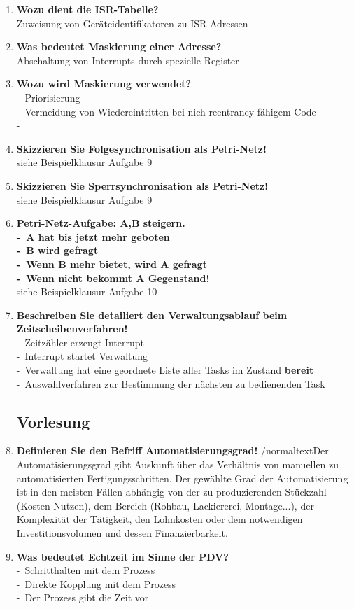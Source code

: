 \documentclass[a4paper,12pt]{article}
\newcommand{\questionnopage}[2]{\pagebreak[3]\item {\textbf{#1?}}#2}
\newcommand{\statementnopage}[2]{\pagebreak[3]\item {\textbf{#1!}}#2}
\newcommand{\catchword}[1]{\\-\ #1}
\newcommand{\normaltext}[1]{\\#1}
\newcommand{\important}[1]{\textbf{#1}}
\begin{document}
\begin{enumerate}
  \questionnopage{Wozu dient die ISR-Tabelle}
  {
    \normaltext{Zuweisung von Geräteidentifikatoren zu ISR-Adressen}
  }
  
  \questionnopage{Was bedeutet Maskierung einer Adresse}
  {
    \normaltext{Abschaltung von Interrupts durch spezielle Register}
  }
  
  \questionnopage{Wozu wird Maskierung verwendet}
  {
    \catchword{Priorisierung}
    \catchword{Vermeidung von Wiedereintritten bei nich reentrancy fähigem Code}
    \catchword{}
  }
  
  \statementnopage{Skizzieren Sie Folgesynchronisation als Petri-Netz}
  {
  \normaltext{siehe Beispielklausur Aufgabe 9}
  }
  
  \statementnopage{Skizzieren Sie Sperrsynchronisation als Petri-Netz}
  {
  \normaltext{siehe Beispielklausur Aufgabe 9}
  }
  
  \statementnopage{Petri-Netz-Aufgabe: A,B steigern. \catchword{A hat bis jetzt mehr geboten}
  \catchword{B wird gefragt} \catchword{Wenn B mehr bietet, wird A gefragt} \catchword{Wenn
  nicht bekommt A Gegenstand}}
  {
  \normaltext{siehe Beispielklausur Aufgabe 10}
  }
  
  \statementnopage{Beschreiben Sie detailiert den Verwaltungsablauf beim Zeitscheibenverfahren}
  {
  \catchword{Zeitzähler erzeugt Interrupt}
  \catchword{Interrupt startet Verwaltung}
  \catchword{Verwaltung hat eine geordnete Liste aller Tasks im Zustand \important{bereit}}
  \catchword{Auswahlverfahren zur Bestimmung der nächsten zu bedienenden Task}
  }

  \subsection{Vorlesung}

\statementnopage{Definieren Sie den Befriff Automatisierungsgrad}  
{
  /normaltext{Der Automatisierungsgrad gibt Auskunft über das Verhältnis 
  von manuellen zu automatisierten Fertigungsschritten. 
  Der gewählte Grad der Automatisierung ist in den meisten Fällen abhängig 
  von der zu produzierenden Stückzahl (Kosten-Nutzen), dem Bereich (Rohbau, 
  Lackiererei, Montage...), der Komplexität der Tätigkeit, den Lohnkosten 
  oder dem notwendigen Investitionsvolumen und dessen Finanzierbarkeit.}

}

  \questionnopage{Was bedeutet Echtzeit im Sinne der PDV}
  {
    \catchword{Schritthalten mit dem Prozess}
    \catchword{Direkte Kopplung mit dem Prozess}
    \catchword{Der Prozess gibt die Zeit vor}
  }
  

\end{enumerate}
\end{document}
